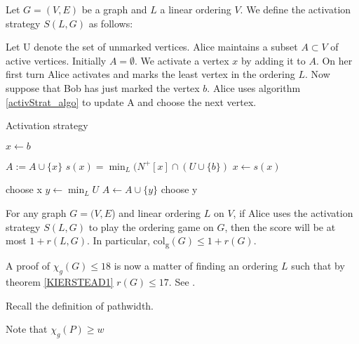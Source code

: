 \begin{definition} 
    Let $G=(V, E)$ be a graph and $L$ a linear ordering $V$. We define the activation strategy $S(L,G)$ as follows:
    
    Let U denote the set of unmarked vertices. Alice maintains a subset $A \subset V$ of active vertices. Initially $A = \emptyset$. We activate a vertex $x$ by adding it to $A$. On her first turn Alice activates and marks the least vertex in the ordering $L$. Now suppose that Bob has just marked the vertex $b$. Alice uses algorithm \ref{activStrat_algo} to update A and choose the
    next vertex.
    \begin{algorithm}[h]
        \caption{Activation strategy}
        \label{activStrat_algo}
        \begin{algorithmic}[1]
            \Statex
            \State $x \gets b$ 
            
                \State $A := A \cup \{x\}$
                \State $s(x) =\min_L(N^+[x] \cap (U \cup \{b\} )$
                \State $x \gets s(x)$
            \EndWhile      
            
                \State choose x
            \Else
                \State $y \gets \min_L U$
                    \State $A \gets A \cup \{y\}$                    
                \EndIf     
                \State choose y
            \EndIf   
        \end{algorithmic}
    \end{algorithm}
    
\end{definition}


\begin{theorem} \label{KIERSTEAD1}
    For any graph $G=(V, E$) and linear ordering $L$ on $V$, if Alice uses the activation strategy $S(L, G)$ to play the ordering game on $G$, then the score will be at most $1+r(L, G)$. In particular, col\textsubscript{g}$(G) \leq 1+r(G)$.
\end{theorem}

A proof of $\chi_g(G) \leq 18$ is now a matter of finding an ordering $L$ such that by theorem \ref{KIERSTEAD1} $r(G) \leq 17$. See \cite{KIERSTEAD2000}.

Recall the definition of pathwidth.

Note that $\chi_g(P) \geq w$

